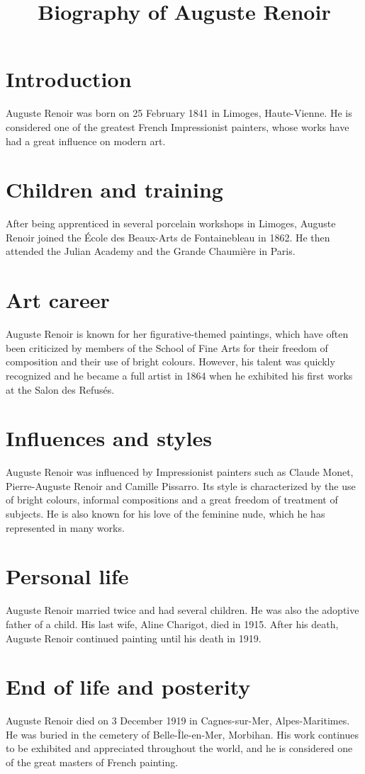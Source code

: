 \documentclass[12pt, a4paper]{article}
\title{Biography of Auguste Renoir}
\author{}
\date{}
\begin{document}
\maketitle
\section*{Introduction}
\noindent
Auguste Renoir was born on 25 February 1841 in Limoges, Haute-Vienne. He is considered one of the greatest French Impressionist painters, whose works have had a great influence on modern art.
\section*{Children and training}
\noindent
After being apprenticed in several porcelain workshops in Limoges, Auguste Renoir joined the École des Beaux-Arts de Fontainebleau in 1862. He then attended the Julian Academy and the Grande Chaumière in Paris.
\section*{Art career}
\noindent
Auguste Renoir is known for her figurative-themed paintings, which have often been criticized by members of the School of Fine Arts for their freedom of composition and their use of bright colours. However, his talent was quickly recognized and he became a full artist in 1864 when he exhibited his first works at the Salon des Refusés.
\section*{Influences and styles}
\noindent
Auguste Renoir was influenced by Impressionist painters such as Claude Monet, Pierre-Auguste Renoir and Camille Pissarro. Its style is characterized by the use of bright colours, informal compositions and a great freedom of treatment of subjects. He is also known for his love of the feminine nude, which he has represented in many works.
\section*{Personal life}
\noindent
Auguste Renoir married twice and had several children. He was also the adoptive father of a child. His last wife, Aline Charigot, died in 1915. After his death, Auguste Renoir continued painting until his death in 1919.
\section*{End of life and posterity}
\noindent
Auguste Renoir died on 3 December 1919 in Cagnes-sur-Mer, Alpes-Maritimes. He was buried in the cemetery of Belle-Île-en-Mer, Morbihan. His work continues to be exhibited and appreciated throughout the world, and he is considered one of the great masters of French painting.
\end{document}
